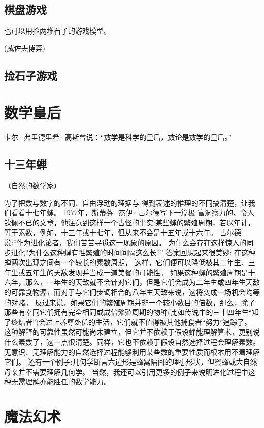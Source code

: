 \documentclass[export, 12pt, letterpaper]{ctexrep}
\begin{document}
\section{棋盘游戏}
也可以用捡两堆石子的游戏模型。

(威佐夫博弈)


\section{捡石子游戏}




\chapter{数学皇后}


卡尔·弗里德里希·高斯曾说：“数学是科学的皇后，数论是数学的皇后。”
\section{十三年蝉}
（自然的数学家）

为了把数与数字的不同、自由浮动的理据与 得到表述的推理的不同搞清楚，让我们看看十七年蝉。
1977年，斯蒂芬·杰伊·古尔德写下一篇极 富洞察力的、令人钦佩不已的文章，他注意到这样一个古怪的事实:某些蝉的繁殖周期，若以年计，等于素数，例如，十三年或十七年，但从来不会是十五年或十六年。
古尔德说:“作为进化论者，我们苦苦寻觅这一现象的原因。
为什么会存在这样惊人的同步进化?为什么这种蝉有性繁殖的时间间隔这么长?”
答案回想起来很美妙: 在这种蝉两次出现之间有一个较长的素数周期， 这样，它们便可以降低被其二年生、三年生或五年生的天敌发现并当成一道美餐的可能性。
如果这种蝉的繁殖周期是十六年，那么，一年生的天敌就不会针对它们，但是它们会成为二年生或四年生天敌的可靠食物源，而对于与它们步调相合的八年生天敌来说，这将变成一场机会均等的对赌。
反过来说，如果它们的繁殖周期并非一个较小数目的倍数，那么，除了那些有幸同它们拥有完全相同或成倍繁殖周期的物种(比如传说中的三十四年生“知了终结者”)会过上养尊处优的生活，它们就不值得被其他捕食者“努力”追踪了。
这种解释的可靠性虽然可能尚未建立，但它并不依赖于假设蝉能理解算术，更别说什么素数了，这一点很清楚。同样，它也不依赖于假设自然选择过程会理解素数。
无意识、无理解能力的自然选择过程能够利用某些数的重要性质而根本用不着理解它们。
还有一个例子:几何学断言六边形是蜂窝隔间的理想形状，但蜜蜂或大自然母亲并不需要理解几何学。
当然，我还可以引用更多的例子来说明进化过程中这种无需理解亦能胜任的数学能力。




\chapter{魔法幻术}
\end{document}
